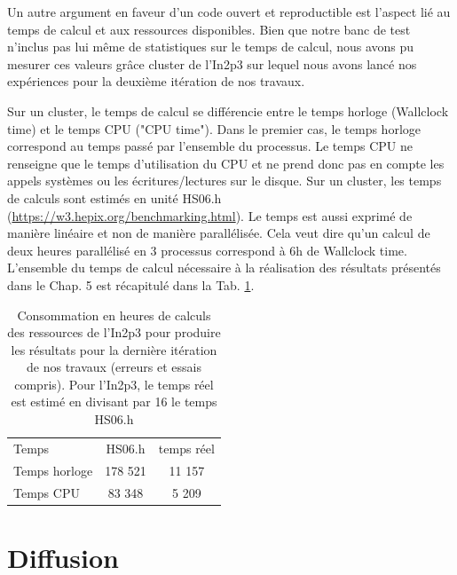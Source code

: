 Un autre argument en faveur d'un code ouvert et reproductible est l'aspect lié au temps de calcul et aux ressources disponibles. Bien que notre banc de test n'inclus pas lui même de statistiques sur le temps de calcul, nous avons pu mesurer ces valeurs grâce cluster de l'In2p3 sur lequel nous avons lancé nos expériences pour la deuxième itération de nos travaux. 

Sur un cluster, le temps de calcul se différencie entre le temps horloge (Wallclock time) et le temps CPU ("CPU time"). Dans le premier cas, le temps horloge correspond au temps passé par l'ensemble du processus. Le temps CPU ne renseigne que le temps d'utilisation du CPU et ne prend donc pas en compte les appels systèmes ou les écritures/lectures sur le disque. Sur un cluster, les temps de calculs sont estimés en unité HS06.h (\url{https://w3.hepix.org/benchmarking.html}). Le temps est aussi exprimé de manière linéaire et non de manière parallélisée. Cela veut dire qu'un calcul de deux heures parallélisé en 3 processus correspond à 6h de Wallclock time. L'ensemble du temps de calcul nécessaire à la réalisation des résultats présentés dans le Chap. 5 est récapitulé dans la Tab. \ref{tab:consumption_in2p3}.

\begin{table}
    \begin{tabular}{lcc}
        \hline
        Temps         & HS06.h   & temps réel \\
        Temps horloge &  178 521 &    11 157  \\
        Temps CPU     &  83 348  &     5 209  \\
    \end{tabular}
    \caption{Consommation en heures de calculs des ressources de l'In2p3 pour produire les résultats pour la dernière itération de nos travaux (erreurs et essais compris). Pour l'In2p3, le temps réel est estimé en divisant par 16 le temps HS06.h}
    \label{tab:consumption_in2p3}
\end{table}


\section{Diffusion}

